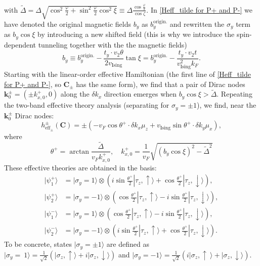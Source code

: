 \begin{subappendices}
	with $\widetilde\Delta=\Delta\sqrt{\cos^2\frac{\varphi}{2}+\sin^2\frac{\varphi}{2}\cos^2\xi}\equiv\Delta\frac{\cos\frac{\varphi}{2}}{\cos\zeta}$. In \eqref{Heff_tilde for P+ and P-} we have denoted the original magnetic fields $b_y$ as $b_y^{\text{origin.}}$ and rewritten the $\sigma_y$ term as $b_y\cos\xi$ by introducing a new shifted field (this is why we introduce the spin-dependent tunneling together with the the magnetic fields)
	\begin{equation*}
		b_y\equiv b_y^{\text{origin.}}-\frac{t_y\cdot v_2\theta}{2v_{\text{Ising}}}\tan\xi=b_y^{\text{origin.}}-\frac{t_y\cdot v_2 t}{v_{\text{Ising}}^2 k_F}.
	\end{equation*}
	\indent Starting with the linear-order effective Hamiltonian (the first line of \eqref{Heff_tilde for P+ and P-}, so $\bm{C}_\pm$ has the same form), we find that a pair of Dirac nodes $\bm{k}^\pm_0=(\pm k^+_{x,0},0)$ along the $\delta k_x$ direction emerges when $b_y\cos\xi>\widetilde\Delta$. Repeating the two-band effective theory analysis (separating for $\sigma_y=\pm1$), we find, near the $\bm{k}_0^\pm$ Dirac nodes:
	\begin{equation}\label{heff for P+ and P-}
		h^\pm_{\text{eff}_\pm}(\bm{C})=\pm(-v_F\cos\theta^+\cdot\delta k_x\mu_z+v_{\text{Ising}}\sin\theta^+\cdot\delta k_y\mu_x),
	\end{equation}
	where
	\begin{equation*}
		\theta^+=\arctan\frac{\widetilde\Delta}{v_F k^+_{x,0}},\quad k^+_{x,0}=\frac{1}{v_F}\sqrt{(b_y\cos\xi)^2-\widetilde\Delta^2}
	\end{equation*}
	These effective theories are obtained in the basis:
	\begin{align*}
		|\psi^+_1\rangle & =|\sigma_y=1\rangle\otimes (i\sin\frac{\theta^+}{2}|\tau_z,\uparrow\rangle+\cos\frac{\theta^+}{2}|\tau_z,\downarrow\rangle),  \\
		|\psi^+_2\rangle & =|\sigma_y=-1\rangle\otimes (\cos\frac{\theta^+}{2}|\tau_z,\uparrow\rangle-i\sin\frac{\theta^+}{2}|\tau_z,\downarrow\rangle), \\
		|\psi^-_1\rangle & =|\sigma_y=1\rangle\otimes(\cos\frac{\theta^+}{2}|\tau_z,\uparrow\rangle-i\sin\frac{\theta^+}{2}|\tau_z,\downarrow\rangle),   \\
		|\psi^-_2\rangle & =|\sigma_y=-1\rangle\otimes (i\sin\frac{\theta^+}{2}|\tau_z,\uparrow\rangle+\cos\frac{\theta^+}{2}|\tau_z,\downarrow\rangle).
	\end{align*}
	To be concrete, states $|\sigma_y=\pm 1\rangle$ are defined as $|\sigma_y=~1\rangle=\frac{1}{\sqrt{2}}(|\sigma_z,\uparrow\rangle+i|\sigma_z,\downarrow\rangle)$ and $|\sigma_y=-1\rangle=\frac{1}{\sqrt{2}}(i|\sigma_z,\uparrow~\rangle+|\sigma_z,\downarrow\rangle)$.\par

\end{subappendices}
